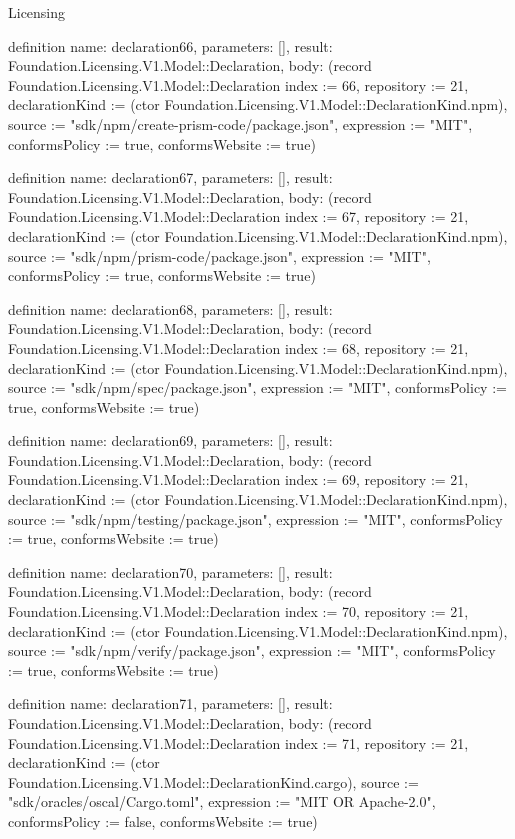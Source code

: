\begin{lexlean}{Licensing}
\begin{semanticmodule}
definition{
  name: declaration66,
  parameters: [],
  result: Foundation.Licensing.V1.Model::Declaration,
  body: (record Foundation.Licensing.V1.Model::Declaration {index := 66, repository := 21, declarationKind := (ctor Foundation.Licensing.V1.Model::DeclarationKind.npm), source := "sdk/npm/create-prism-code/package.json", expression := "MIT", conformsPolicy := true, conformsWebsite := true})
}

definition{
  name: declaration67,
  parameters: [],
  result: Foundation.Licensing.V1.Model::Declaration,
  body: (record Foundation.Licensing.V1.Model::Declaration {index := 67, repository := 21, declarationKind := (ctor Foundation.Licensing.V1.Model::DeclarationKind.npm), source := "sdk/npm/prism-code/package.json", expression := "MIT", conformsPolicy := true, conformsWebsite := true})
}

definition{
  name: declaration68,
  parameters: [],
  result: Foundation.Licensing.V1.Model::Declaration,
  body: (record Foundation.Licensing.V1.Model::Declaration {index := 68, repository := 21, declarationKind := (ctor Foundation.Licensing.V1.Model::DeclarationKind.npm), source := "sdk/npm/spec/package.json", expression := "MIT", conformsPolicy := true, conformsWebsite := true})
}

definition{
  name: declaration69,
  parameters: [],
  result: Foundation.Licensing.V1.Model::Declaration,
  body: (record Foundation.Licensing.V1.Model::Declaration {index := 69, repository := 21, declarationKind := (ctor Foundation.Licensing.V1.Model::DeclarationKind.npm), source := "sdk/npm/testing/package.json", expression := "MIT", conformsPolicy := true, conformsWebsite := true})
}

definition{
  name: declaration70,
  parameters: [],
  result: Foundation.Licensing.V1.Model::Declaration,
  body: (record Foundation.Licensing.V1.Model::Declaration {index := 70, repository := 21, declarationKind := (ctor Foundation.Licensing.V1.Model::DeclarationKind.npm), source := "sdk/npm/verify/package.json", expression := "MIT", conformsPolicy := true, conformsWebsite := true})
}

definition{
  name: declaration71,
  parameters: [],
  result: Foundation.Licensing.V1.Model::Declaration,
  body: (record Foundation.Licensing.V1.Model::Declaration {index := 71, repository := 21, declarationKind := (ctor Foundation.Licensing.V1.Model::DeclarationKind.cargo), source := "sdk/oracles/oscal/Cargo.toml", expression := "MIT OR Apache-2.0", conformsPolicy := false, conformsWebsite := true})
}


\end{semanticmodule}
\end{lexlean}
